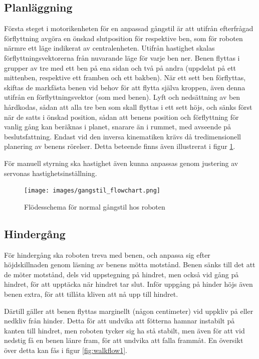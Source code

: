 \documentclass[a4paper,titlepage,12pt]{article}
\begin{document}
		\subsection{Planläggning}
	Första steget i motorikenheten för en anpassad gångstil är att utifrån efterfrågad
	förflyttning avgöra en önskad slutposition för respektive ben, som för roboten närmre 
	ett läge indikerat av centralenheten. Utifrån hastighet skalas förflyttningsvektorerna 
	från nuvarande läge för varje ben ner. Benen flyttas i grupper av tre med ett ben på 
	ena sidan och två på  andra (uppdelat på ett mittenben, respektive ett framben och ett 
	bakben). När ett sett ben förflyttas, skiftas de markfästa benen vid behov för 
	att flytta själva kroppen, även denna utifrån en förflyttningsvektor (som med benen). 
	Lyft och nedsättning av ben hårdkodas, sådan att alla tre ben som skall flyttas i ett 
	sett höjs, och sänks först när de satts i önskad position, sådan att benens position 
	och förflyttning för vanlig gång kan beräknas i planet, snarare än i rummet, med 
	avseende på beslutsfattning. Endast vid den inversa kinematiken krävs då 
	tredimensionell planering av benens rörelser. Detta beteende finns även illustrerat i 
	figur \ref{fig:walkflow0}. 
	
	För manuell styrning ska hastighet även kunna anpassas genom justering av servonas
	hastighetsinställning.

	\begin{figure}[h]
		\centering
		\texttt{[image: images/gangstil\_flowchart.png]}
		\caption{Flödesschema för normal gångstil hos roboten \label{fig:walkflow0}}
	\end{figure}

	\subsection{Hindergång}
	För hindergång ska roboten treva med benen, och anpassa sig efter höjdskillnaden genom
	läsning av benens mötta motstånd. Benen sänks till det att de möter motstånd, dels
	vid uppstegning på hindret, men också vid gång på hindret, för att upptäcka när hindret 
	tar slut. Inför uppgång på hinder höjs även benen extra, för att tillåta kliven att nå 
	upp till hindret.

	Därtill gäller att benen flyttas marginellt (någon centimeter) vid uppkliv på eller 
	nedkliv från hinder. Detta för att undvika att fötterna hamnar instabilt på kanten till 
	hindret, men roboten tycker sig ha stå stabilt, men även för att vid nedstig få en benen 
	länre fram, för att undvika att falla frammåt. En översikt över detta kan fås i figur \ref{fig:walkflow1}.
\end{document}
